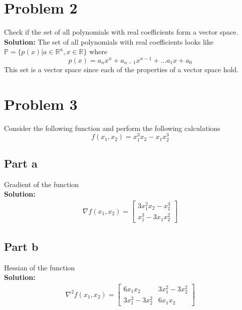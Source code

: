 \documentclass[11pt]{article}
\begin{document}
\section{Problem 2}
Check if the set of all polynomials with real coefficients form a vector space.
\\
\textbf{Solution: }
The set of all polynomials with real coefficients looks like $ \mathbb{P} = \{ p(x) | a \in \mathbb{R}^n, x \in \mathbb{R} \}$ where
\begin{equation*}
  p(x) = a_n x^n + a_{n-1} x^{n-1}  + \dots a_1 x + a_0
\end{equation*}
This set is a vector space since each of the properties of a vector space hold.

\section{Problem 3}
Consider the following function and perform the following calculations
\begin{equation*}
    f(x_1, x_2) = x_1^3 x_2 - x_1 x_2^3
\end{equation*}

\subsection{Part a}
Gradient of the function
\\
\textbf{Solution: }
\begin{align*}
    \nabla f(x_1, x_2) = 
  \begin{bmatrix}
     3x_1^2 x_2 - x_2^3 \\
     x_1^3 - 3x_1 x_2^2
  \end{bmatrix}
\end{align*}

\subsection{Part b}
Hessian of the function
\\
\textbf{Solution: }
\begin{align*}
    \nabla^2 f(x_1, x_2) = 
  \begin{bmatrix}
     6x_1 x_2 & 3x_1^2 - 3x_2^2 \\
     3x_1^2 - 3x_2^2 &  6 x_1 x_2
  \end{bmatrix}
\end{align*}
\end{document}
